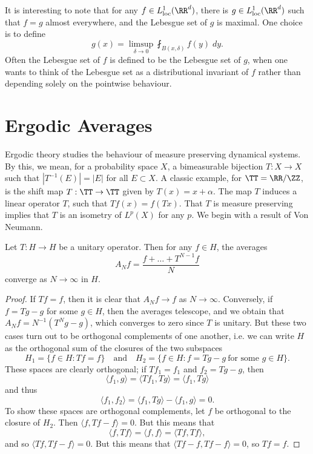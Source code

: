 It is interesting to note that for any $f \in L^1_{\text{loc}}(\RR^d)$, there is $g \in L^1_{\text{loc}}(\RR^d)$ such that $f = g$ almost everywhere, and the Lebesgue set of $g$ is maximal. One choice is to define
%
\[ g(x) = \limsup_{\delta \to 0} \fint_{B(x,\delta)} f(y)\; dy. \]
%
Often the Lebesgue set of $f$ is defined to be the Lebesgue set of $g$, when one wants to think of the Lebesgue set as a distributional invariant of $f$ rather than depending solely on the pointwise behaviour.

\section{Ergodic Averages}

Ergodic theory studies the behaviour of measure preserving dynamical systems. By this, we mean, for a probability space $X$, a bimeasurable bijection $T: X \to X$ such that $|T^{-1}(E)| = |E|$ for all $E \subset X$. A classic example, for $\TT = \RR / \ZZ$, is the shift map $T: \TT \to \TT$ given by $T(x) = x + \alpha$. The map $T$ induces a linear operator $T$, such that $Tf(x) = f(Tx)$. That $T$ is measure preserving implies that $T$ is an isometry of $L^p(X)$ for any $p$. We begin with a result of Von Neumann.

\begin{theorem}
    Let $T: H \to H$ be a unitary operator. Then for any $f \in H$, the averages
    \[ A_N f = \frac{f + \dots + T^{N-1} f}{N} \]
    converge as $N \to \infty$ in $H$.
\end{theorem}
\begin{proof}
    If $Tf = f$, then it is clear that $A_N f \to f$ as $N \to \infty$. Conversely, if $f = Tg - g$ for some $g \in H$, then the averages telescope, and we obtain that $A_N f = N^{-1}(T^Ng - g)$, which converges to zero since $T$ is unitary. But these two cases turn out to be orthogonal complements of one another, i.e. we can write $H$ as the orthogonal sum of the closures of the two subspaces
    \[ H_1 = \{ f \in H: Tf = f \} \quad\text{and}\quad H_2 = \{ f \in H: f = Tg - g\ \text{for some $g \in H$} \}. \]
    These spaces are clearly orthogonal; if $Tf_1 = f_1$ and $f_2 = Tg - g$, then
    \[ \langle f_1, g \rangle = \langle Tf_1, Tg \rangle = \langle f_1, Tg \rangle \]
    and thus
    \[ \langle f_1, f_2 \rangle = \langle f_1, Tg \rangle - \langle f_1, g \rangle = 0. \]
    To show these spaces are orthogonal complements, let $f$ be orthogonal to the closure of $H_2$. Then $\langle f, Tf - f \rangle = 0$. But this means that
    \[ \langle f, Tf \rangle = \langle f, f \rangle = \langle Tf, Tf \rangle, \]
    and so $\langle Tf, Tf - f \rangle = 0$. But this means that $\langle Tf - f, Tf - f \rangle = 0$, so $Tf = f$.
\end{proof}

